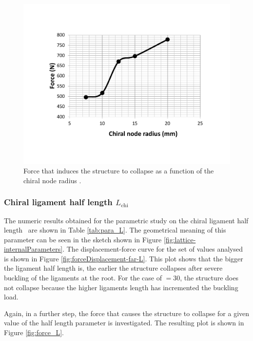       \begin{figure}[!htpb] %
        \centering
        \includegraphics[width=0.8 \textwidth]{figures/result-sim/r/force_r}
        \caption[Force that induces the structure to collapse as a function of the chiral node depth]{Force that induces the structure to collapse as a function of the chiral node radius \chir.}\label{fig:force_r}
      \end{figure}

    \clearpage
    \subsubsection{Chiral ligament half length $L_{\mathrm{chi}}$}

      The numeric results obtained for the parametric study on the chiral ligament half length \chiL\ are shown in Table \ref{tab:para_L}. The geometrical meaning of this parameter can be seen in the sketch shown in Figure \ref{fig:lattice-internalParameters}. The displacement-force curve for the set of values analysed is shown in Figure \ref{fig:forceDisplacement-far-L}. This plot shows that the bigger the ligament half length is, the earlier the structure collapses after severe buckling of the ligaments at the root. For the case of \chiL$= 30$, the structure does not collapse because the higher ligaments length has incremented the buckling load.

      Again, in a further step, the force that causes the structure to collapse for a given value of the half length \chiL parameter is investigated. The resulting plot is shown in Figure \ref{fig:force_L}.

